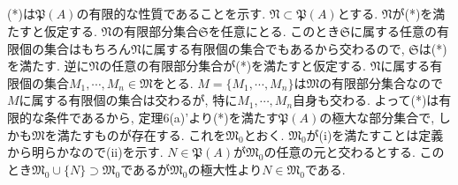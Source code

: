 \documentclass{jsarticle}
\begin{document}
\subsection{} %
(*)は$\mathfrak{P}(A)$の有限的な性質であることを示す. $\mathfrak{N} \subset \mathfrak{P}(A)$とする. $\mathfrak{N}$が(*)を満たすと仮定する. $\mathfrak{N}$の有限部分集合$\mathfrak{S}$を任意にとる. このとき$\mathfrak{S}$に属する任意の有限個の集合はもちろん$\mathfrak{N}$に属する有限個の集合でもあるから交わるので, $\mathfrak{S}$は(*)を満たす. 逆に$\mathfrak{N}$の任意の有限部分集合が(*)を満たすと仮定する. $\mathfrak{N}$に属する有限個の集合$M_1, \cdots, M_n \in \mathfrak{M}$をとる. $M = \{M_1, \cdots, M_n\}$は$\mathfrak{M}$の有限部分集合なので$M$に属する有限個の集合は交わるが, 特に$M_1, \cdots, M_n$自身も交わる. よって(*)は有限的な条件であるから, 定理6(a)'より(*)を満たす$\mathfrak{P}(A)$の極大な部分集合で, しかも$\mathfrak{M}$を満たすものが存在する. これを$\mathfrak{M}_0$とおく. $\mathfrak{M}_0$が(i)を満たすことは定義から明らかなので(ii)を示す. $N \in \mathfrak{P}(A)$が$\mathfrak{M}_0$の任意の元と交わるとする. このとき$\mathfrak{M}_0 \cup \{N\} \supset \mathfrak{M}_0$であるが$\mathfrak{M}_0$の極大性より$N \in \mathfrak{M}_0$である.
\end{document}
